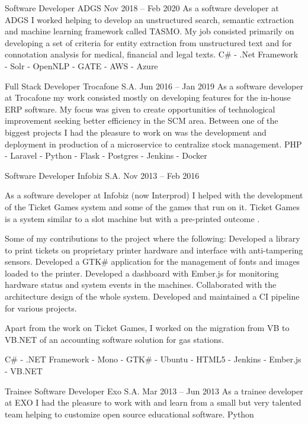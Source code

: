 \documentclass[10pt,a4paper]{article}
\begin{document}
\jobdescription
    { Software Developer }
    { ADGS }
    { Nov 2018 -- Feb 2020 }
    { 
        As a software developer at ADGS I worked helping to develop an unstructured search, semantic extraction and machine learning framework called TASMO. My job consisted primarily on developing a set of criteria for entity extraction from unstructured text and for connotation analysis for medical, financial and legal texts.
    }
    {
        C\# - .Net Framework - Solr - OpenNLP - GATE - AWS - Azure
    }

\jobdescription
    { Full Stack Developer }
    { Trocafone S.A. }
    { Jun 2016 -- Jan 2019 }
    { 
        As a software developer at Trocafone my work consisted mostly on developing features for the in-house ERP software. My focus was given to create opportunities of technological improvement seeking better efficiency in the SCM area. Between one of the biggest projects I had the pleasure to work on was the development and deployment in production of a microservice to centralize stock management.
    }
    {
        PHP - Laravel - Python - Flask - Postgres - Jenkins - Docker
    }

\jobdescription
    { Software Developer }
    { Infobiz S.A. }
    { Nov 2013 -- Feb 2016 }
    {
        As a software developer at Infobiz (now Interprod) I helped with the development of the Ticket Games system  and some of the games that run on it. Ticket Games is a system similar to a slot machine but with a pre-printed outcome \href{https://web.archive.org/web/20180903134404/http://infobiz.com.ar/english/ticket_games.php}{\ExternalLink}.

        

        Some of my contributions to the project where the following:
        Developed a library to print tickets on proprietary printer hardware and interface with anti-tampering sensors.
        Developed a GTK\# application for the management of fonts and images loaded to the printer.
        Developed a dashboard with Ember.js for monitoring hardware status and system events in the machines.
        Collaborated with the architecture design of the whole system.
        Developed and maintained a CI pipeline for various projects.

        Apart from the work on Ticket Games, I worked on the migration from VB to VB.NET of an accounting software solution for gas stations.
    }
    {
        C\# - .NET Framework - Mono - GTK\# - Ubuntu - HTML5 - Jenkins - Ember.js - VB.NET
    }

\jobdescription
    { Trainee Software Developer }
    { Exo S.A. }
    { Mar 2013 -- Jun 2013 }
    {
        As a trainee developer at EXO I had the pleasure to work with and learn from a small but very talented team helping to customize open source educational software.
    }
    {
        Python
    }
\end{document}
